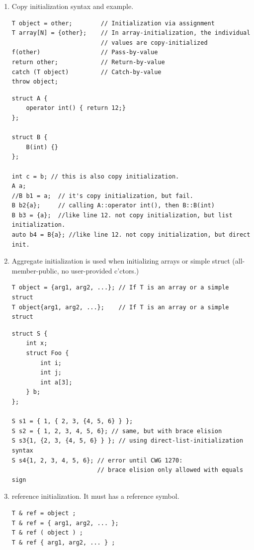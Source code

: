 \documentclass[a4paper,11pt,twoside]{book}
\begin{document}
\begin{itemize}
\begin{enumerate}
		\item Copy initialization syntax and example.
\begin{lstlisting}[numbers=none]
T object = other;        // Initialization via assignment
T array[N] = {other};    // In array-initialization, the individual
						 // values are copy-initialized
f(other)                 // Pass-by-value
return other;            // Return-by-value
catch (T object)         // Catch-by-value
throw object;
\end{lstlisting}

\begin{lstlisting}[]
struct A {
	operator int() { return 12;}
};

struct B {
	B(int) {}
};

int c = b; // this is also copy initialization. 
A a;
//B b1 = a;  // it's copy initialization, but fail. 
B b2{a};     // calling A::operator int(), then B::B(int)
B b3 = {a};  //like line 12. not copy initialization, but list initialization.
auto b4 = B{a}; //like line 12. not copy initialization, but direct init.
\end{lstlisting}

		\item Aggregate initialization is used when initializing arrays or simple struct (all-member-public, no user-provided c'ctors.)
\begin{lstlisting}[numbers=none]
T object = {arg1, arg2, ...}; // If T is an array or a simple struct
T object{arg1, arg2, ...};    // If T is an array or a simple struct
\end{lstlisting}

\begin{lstlisting}[numbers=none]
struct S {
	int x;
	struct Foo {
		int i;
		int j;
		int a[3];
	} b;
};

S s1 = { 1, { 2, 3, {4, 5, 6} } };
S s2 = { 1, 2, 3, 4, 5, 6}; // same, but with brace elision
S s3{1, {2, 3, {4, 5, 6} } }; // using direct-list-initialization syntax
S s4{1, 2, 3, 4, 5, 6}; // error until CWG 1270: 
						// brace elision only allowed with equals sign
\end{lstlisting}

		\item reference initialization. It must has a reference symbol.
\begin{lstlisting}[numbers=none]
T & ref = object ;
T & ref = { arg1, arg2, ... };
T & ref ( object ) ;
T & ref { arg1, arg2, ... } ;
\end{lstlisting}
	\end{enumerate}


\end{itemize}
\end{document}

